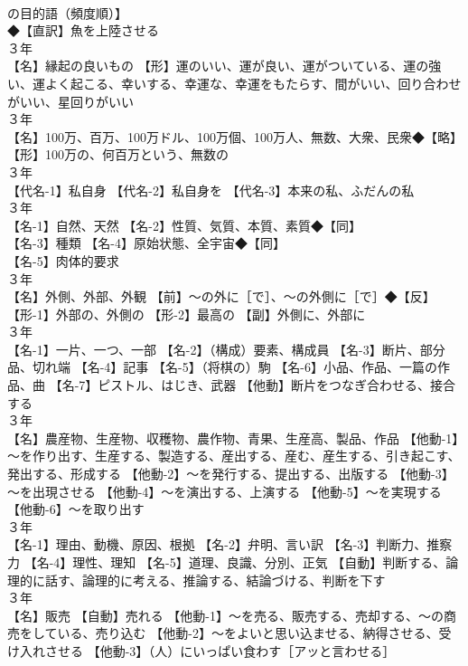 \documentclass[8pt]{extreport}
\begin{document}
\begin{CJK}{UTF8}{min}
\\	の目的語（頻度順）】
\\	◆【直訳】魚を上陸させる
\\	３年	
\\	【名】縁起の良いもの 【形】運のいい、運が良い、運がついている、運の強い、運よく起こる、幸いする、幸運な、幸運をもたらす、間がいい、回り合わせがいい、星回りがいい
\\	３年	
\\	【名】100万、百万、100万ドル、100万個、100万人、無数、大衆、民衆◆【略】
\\	【形】100万の、何百万という、無数の
\\	３年	
\\	【代名-1】私自身 【代名-2】私自身を 【代名-3】本来の私、ふだんの私
\\	３年	
\\	【名-1】自然、天然 【名-2】性質、気質、本質、素質◆【同】
\\	【名-3】種類 【名-4】原始状態、全宇宙◆【同】
\\	【名-5】肉体的要求
\\	３年	
\\	【名】外側、外部、外観 【前】～の外に［で］、～の外側に［で］◆【反】
\\	【形-1】外部の、外側の 【形-2】最高の 【副】外側に、外部に
\\	３年	
\\	【名-1】一片、一つ、一部 【名-2】（構成）要素、構成員 【名-3】断片、部分品、切れ端 【名-4】記事 【名-5】（将棋の）駒 【名-6】小品、作品、一篇の作品、曲 【名-7】ピストル、はじき、武器 【他動】断片をつなぎ合わせる、接合する
\\	３年	
\\	【名】農産物、生産物、収穫物、農作物、青果、生産高、製品、作品 【他動-1】～を作り出す、生産する、製造する、産出する、産む、産生する、引き起こす、発出する、形成する 【他動-2】～を発行する、提出する、出版する 【他動-3】～を出現させる 【他動-4】～を演出する、上演する 【他動-5】～を実現する 【他動-6】～を取り出す
\\	３年	
\\	【名-1】理由、動機、原因、根拠 【名-2】弁明、言い訳 【名-3】判断力、推察力 【名-4】理性、理知 【名-5】道理、良識、分別、正気 【自動】判断する、論理的に話す、論理的に考える、推論する、結論づける、判断を下す
\\	３年	
\\	【名】販売 【自動】売れる 【他動-1】～を売る、販売する、売却する、～の商売をしている、売り込む 【他動-2】～をよいと思い込ませる、納得させる、受け入れさせる 【他動-3】（人）にいっぱい食わす［アッと言わせる］

\end{CJK}
\end{document}
